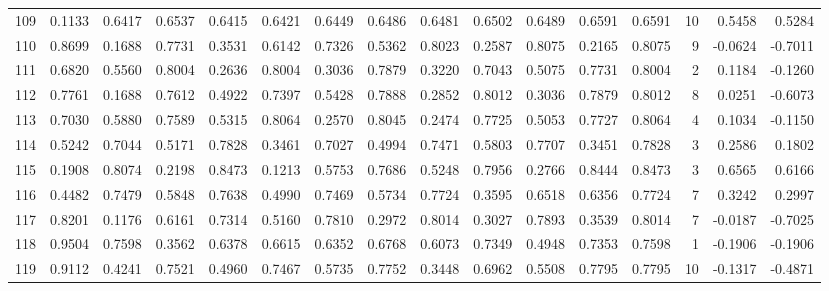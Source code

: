 \begin{tabular}{lrrrrrrrrrrrrrrr}
109 &      0.1133 &  0.6417 &  0.6537 &  0.6415 &  0.6421 &  0.6449 &  0.6486 &  0.6481 &  0.6502 &  0.6489 &   0.6591 &     0.6591 &     10 &                    0.5458 &                     0.5284 \\
110 &      0.8699 &  0.1688 &  0.7731 &  0.3531 &  0.6142 &  0.7326 &  0.5362 &  0.8023 &  0.2587 &  0.8075 &   0.2165 &     0.8075 &      9 &                   -0.0624 &                    -0.7011 \\
111 &      0.6820 &  0.5560 &  0.8004 &  0.2636 &  0.8004 &  0.3036 &  0.7879 &  0.3220 &  0.7043 &  0.5075 &   0.7731 &     0.8004 &      2 &                    0.1184 &                    -0.1260 \\
112 &      0.7761 &  0.1688 &  0.7612 &  0.4922 &  0.7397 &  0.5428 &  0.7888 &  0.2852 &  0.8012 &  0.3036 &   0.7879 &     0.8012 &      8 &                    0.0251 &                    -0.6073 \\
113 &      0.7030 &  0.5880 &  0.7589 &  0.5315 &  0.8064 &  0.2570 &  0.8045 &  0.2474 &  0.7725 &  0.5053 &   0.7727 &     0.8064 &      4 &                    0.1034 &                    -0.1150 \\
114 &      0.5242 &  0.7044 &  0.5171 &  0.7828 &  0.3461 &  0.7027 &  0.4994 &  0.7471 &  0.5803 &  0.7707 &   0.3451 &     0.7828 &      3 &                    0.2586 &                     0.1802 \\
115 &      0.1908 &  0.8074 &  0.2198 &  0.8473 &  0.1213 &  0.5753 &  0.7686 &  0.5248 &  0.7956 &  0.2766 &   0.8444 &     0.8473 &      3 &                    0.6565 &                     0.6166 \\
116 &      0.4482 &  0.7479 &  0.5848 &  0.7638 &  0.4990 &  0.7469 &  0.5734 &  0.7724 &  0.3595 &  0.6518 &   0.6356 &     0.7724 &      7 &                    0.3242 &                     0.2997 \\
117 &      0.8201 &  0.1176 &  0.6161 &  0.7314 &  0.5160 &  0.7810 &  0.2972 &  0.8014 &  0.3027 &  0.7893 &   0.3539 &     0.8014 &      7 &                   -0.0187 &                    -0.7025 \\
118 &      0.9504 &  0.7598 &  0.3562 &  0.6378 &  0.6615 &  0.6352 &  0.6768 &  0.6073 &  0.7349 &  0.4948 &   0.7353 &     0.7598 &      1 &                   -0.1906 &                    -0.1906 \\
119 &      0.9112 &  0.4241 &  0.7521 &  0.4960 &  0.7467 &  0.5735 &  0.7752 &  0.3448 &  0.6962 &  0.5508 &   0.7795 &     0.7795 &     10 &                   -0.1317 &                    -0.4871 \\

\end{tabular}
